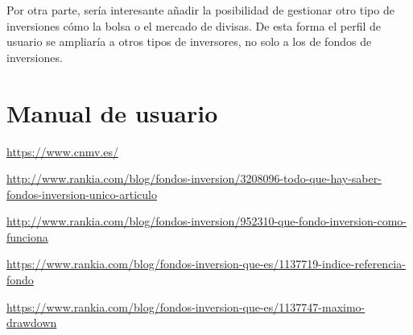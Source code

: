 \documentclass[12pt, a4paper]{book}
\begin{document}
Por otra parte, sería interesante añadir la posibilidad de gestionar otro tipo de inversiones cómo la bolsa o el mercado de divisas. De esta forma el perfil de usuario se ampliaría a otros tipos de inversores, no solo a los de fondos de inversiones.


\appendix
\chapter{Manual de usuario}\label{aped.A}


\cleardoublepage

\newpage

\begin{thebibliography}{10}
	
	
	\bibitem[CNMV]{}
	\newline
	\href{https://www.cnmv.es/}{https://www.cnmv.es/}
	
	\bibitem[Rankia]{}
	\newline
	\href{http://www.rankia.com/blog/fondos-inversion/3208096-todo-que-hay-saber-fondos-inversion-unico-articulo}{http://www.rankia.com/blog/fondos-inversion/3208096-todo-que-hay-saber-fondos-inversion-unico-articulo}
	
	\bibitem[Rankia]{}
	\newline
	\href{http://www.rankia.com/blog/fondos-inversion/952310-que-fondo-inversion-como-funciona}{http://www.rankia.com/blog/fondos-inversion/952310-que-fondo-inversion-como-funciona}
	
	\bibitem[Rankia]{}
	\newline
	\href{https://www.rankia.com/blog/fondos-inversion-que-es/1137719-indice-referencia-fondo}{https://www.rankia.com/blog/fondos-inversion-que-es/1137719-indice-referencia-fondo}
	
	\bibitem[Rankia]{}
	\newline
	\href{https://www.rankia.com/blog/fondos-inversion-que-es/1137747-maximo-drawdown}{https://www.rankia.com/blog/fondos-inversion-que-es/1137747-maximo-drawdown}
	

\end{thebibliography}
\end{document}
